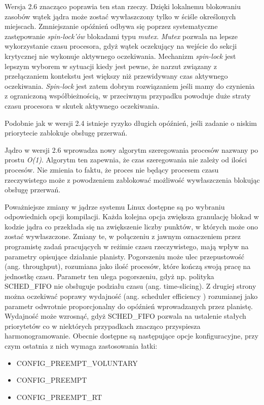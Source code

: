 Wersja 2.6 znacząco poprawia ten stan rzeczy. Dzięki lokalnemu blokowaniu zasobów wątek jądra może zostać wywłaszczony tylko w ściśle określonych miejscach. Zmniejszanie opóźnień odbywa się poprzez systematyczne zastępowanie \emph{spin-lock'ów} blokadami typu \emph{mutex}. \emph{Mutex} pozwala na lepsze wykorzystanie czasu procesora, gdyż wątek oczekujący na wejście do sekcji krytycznej nie wykonuje aktywnego oczekiwania. Mechanizm \emph{spin-lock} jest lepszym wyborem w sytuacji kiedy jest pewne, że narzut związany z przełączaniem kontekstu jest większy niż przewidywany czas aktywnego oczekiwania. \emph{Spin-lock} jest zatem dobrym rozwiązaniem jeśli mamy do czynienia z ograniczoną współbieżnością, w przeciwnym przypadku powoduje duże straty czasu procesora w skutek aktywnego oczekiwania.

Podobnie jak w wersji 2.4 istnieje ryzyko długich opóźnień, jeśli zadanie o niskim priorytecie zablokuje obsługę przerwań.

Jądro w wersji 2.6 wprowadza nowy algorytm szeregowania procesów nazwany po prostu \emph{O(1)}. Algorytm ten zapewnia, że czas szeregowania nie zależy od ilości procesów. Nie zmienia to faktu, że proces nie będący procesem czasu rzeczywistego może z powodzeniem zablokować możliwość wywłaszczenia blokując obsługę przerwań.

Poważniejsze zmiany w jądrze systemu Linux dostępne są po wybraniu odpowiednich opcji kompilacji. Każda kolejna opcja zwiększa granulację blokad w kodzie jądra co przekłada się na zwiększenie liczby punktów, w których może ono zostać wywłaszczone. Zmiany te, w połączeniu z jawnym oznaczeniem przez programistę zadań pracujących w reżimie czasu rzeczywistego, mają wpływ na parametry opisujące działanie planisty. Pogorszeniu może ulec przepustowość (ang. throughput), rozumiana jako ilość procesów, które kończą swoją pracę na jednostkę czasu. Parametr ten ulega pogorszeniu, gdyż np. polityka SCHED\_FIFO nie obsługuje podziału czasu (ang. time-slicing). Z drugiej strony można oczekiwać poprawy wydajność (ang. scheduler efficiency ) rozumianej jako parametr odwrotnie proporcjonalny do opóźnień wprowadzanych przez planistę. Wydajność może wzrosnąć, gdyż SCHED\_FIFO pozwala na ustalenie stałych priorytetów co w niektórych przypadkach znacząco przyspiesza harmonogramowanie. Obecnie dostępne są następujące opcje konfiguracyjne, przy czym ostatnia z nich wymaga zastosowania łatki: 

\begin{itemize}
\item CONFIG\_PREEMPT\_VOLUNTARY
\item CONFIG\_PREEMPT
\item CONFIG\_PREEMPT\_RT
\end{itemize}

